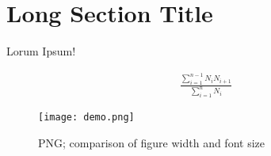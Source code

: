 \documentclass[a4paper,UTF8]{article}
\begin{document}
	\section*{Long Section Title}
	
		
		Lorum Ipsum!

		\begin{equation} \begin{split}
			\frac{\sum_{i=1}^{n-1}N_{i}N_{i+1}}{\sum_{i=1}^{n} N_{i}}
			\label{eq:equation_label}
		\end{split} \end{equation}

		\begin{figure}[ht]
			\texttt{[image: demo.png]}
			\caption{PNG; comparison of figure width and font size}
			\label{fig:png_label}
		\end{figure}
\end{document}
